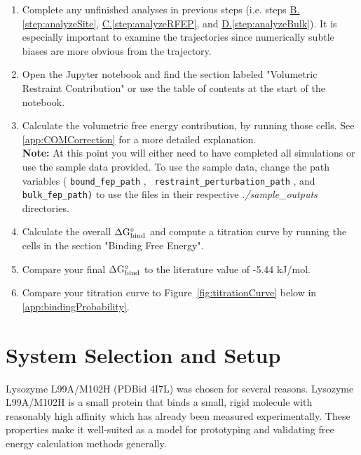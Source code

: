 \documentclass[9pt,tutorial]{Styling/livecoms}
\newcommand{\ezry}[1]{\textcolor{orange}{Ezry: #1}}
\newcommand{\filepath}[1]{\textit{#1}}
\newcommand{\textInput}[1]{
  \texttt{#1}
}
\begin{document}
    \begin{enumerate}
    \item Complete any unfinished analyses in previous steps (i.e. steps \hyperref[step:analyzeSite]{B.\ref{step:analyzeSite}}, \hyperref[step:analyzeRFEP]{C.\ref{step:analyzeRFEP}}, and \hyperref[step:analyzeBulk]{D.\ref{step:analyzeBulk}}).
    It is especially important to examine the trajectories since numerically subtle biases are more obvious from the trajectory.
    \item Open the Jupyter notebook and find the section labeled "Volumetric Restraint Contribution" or use the table of contents at the start of the notebook.
    \item Calculate the volumetric free energy contribution, by running those cells.\label{step:dGV}
    See \ref{app:COMCorrection} for a more detailed explanation.\\
    \textbf{Note:} At this point you will either need to have completed all simulations or use the sample data provided. To use the sample data, change the path variables (\textInput{bound\_fep\_path},\textInput{ restraint\_perturbation\_path}, and \textInput{bulk\_fep\_path\textrm{)}} to use the files in their respective \filepath{./sample\_outputs} directories. 
    \item Calculate the overall $\Delta \rm G_{bind}^\circ$ and compute a titration curve by running the cells in the section "Binding Free Energy".
    \item Compare your final $\Delta \rm G_{bind}^\circ$ to the literature value of -5.44 kJ/mol.\cite{Merski2013}
    \item Compare your titration curve to Figure~\ref{fig:titrationCurve} below in \ref{app:bindingProbability}.

    \end{enumerate}

\newpage
\twocolumn
\label{appendices}
\setcounter{section}{0}
\renewcommand\thesection{Appendix \Alph{section}}
\renewcommand\thesubsection{\thesection.\arabic{subsection}}
\section{System Selection and Setup}\label{app:motivation}
Lysozyme L99A/M102H (PDBid 4I7L) was chosen for several reasons. Lysozyme L99A/M102H is a small protein that binds a small, rigid molecule with reasonably high affinity which has already been measured experimentally. These properties make it well-suited as a model for prototyping and validating free energy calculation methods generally. 
\end{document}
